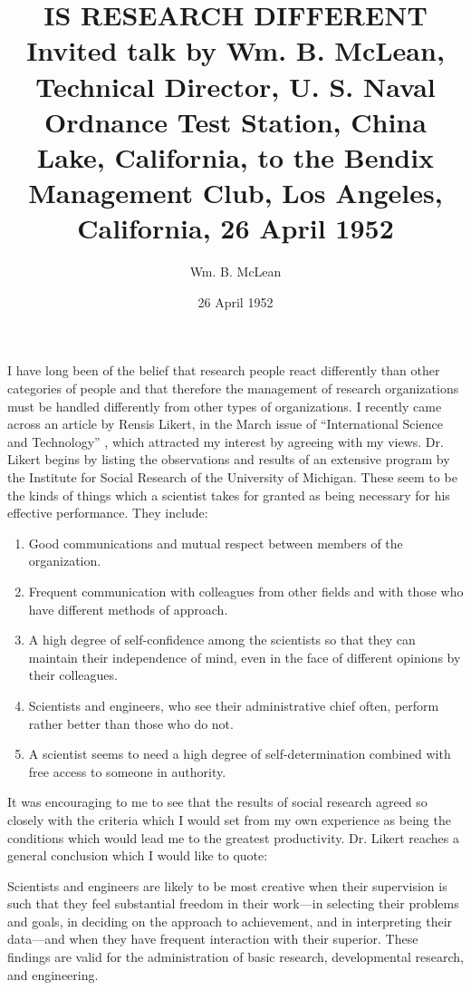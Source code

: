 \documentclass{memoir}
\title{%
  IS RESEARCH DIFFERENT \\
  \large Invited talk by Wm. B. McLean, Technical Director, U. S. Naval Ordnance Test Station, China Lake, California, to the Bendix Management Club, Los Angeles, California, 26 April 1952
}
\author{Wm. B. McLean}
\date{26 April 1952}
\begin{document}
\maketitle

I have long been of the belief that research people react differently than other categories of people and that therefore the management of research organizations must be handled differently from other types of organizations. I recently came across an article by Rensis Likert, in the March issue of ``International Science and Technology'' \cite{likert}, which attracted my interest by agreeing with my views. Dr. Likert begins by listing the observations and results of an extensive program by the Institute for Social Research of the University of Michigan. These seem to be the kinds of things which a scientist takes for granted as being necessary for his effective performance. They include:

\begin{enumerate}
  \item Good communications and mutual respect between members of the organization.
  \item Frequent communication with colleagues from other fields and with those who have different methods of approach.
  \item A high degree of self-confidence among the scientists so that they can maintain their independence of mind, even in the face of different opinions by their colleagues.
  \item Scientists and engineers, who see their administrative chief often, perform rather better than those who do not. 
  \item A scientist seems to need a high degree of self-determination combined with free access to someone in authority. 
\end{enumerate}

It was encouraging to me to see that the results of social research agreed so closely with the criteria which I would set from my own experience as being the conditions which would lead me to the greatest productivity. Dr. Likert reaches a general conclusion which I would like to quote:

\begin{displayquote}
Scientists and engineers are likely to be most creative when their supervision is such that they feel substantial freedom in their work---in selecting their problems and goals, in deciding on the approach to achievement, and in interpreting their data---and when they have frequent interaction with their superior. These findings are valid for the administration of basic research, developmental research, and engineering.
\end{displayquote}
\end{document}
